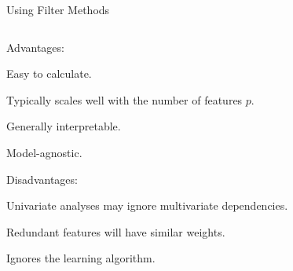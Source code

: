 \documentclass[11pt,compress,t,notes=noshow, xcolor=table]{beamer}
\begin{document}
\begin{vbframe}{Using Filter Methods}
\begin{columns}
  \end{columns}



  \framebreak

  \begin{blocki}{Advantages:}
  \setlength{\itemsep}{1.2em}
    \item Easy to calculate.
    \item Typically scales well with the number of features $p$.
    \item Generally interpretable.
    \item Model-agnostic.
  \end{blocki}

  \begin{blocki}{Disadvantages:}
  \setlength{\itemsep}{1.2em}
    \item Univariate analyses may ignore multivariate dependencies.
    \item Redundant features will have similar weights.
    \item Ignores the learning algorithm.
  \end{blocki}
  \end{vbframe}


  
  
  
  
  
  
  
  
  
\end{document}
